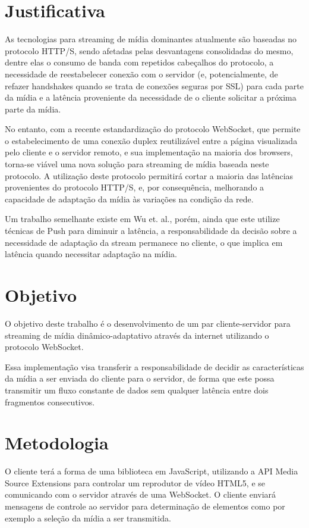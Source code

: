 \documentclass[a4paper,12pt]{article}
\begin{document}
\section{Justificativa}

As tecnologias para streaming de mídia dominantes atualmente são baseadas no protocolo HTTP/S, sendo afetadas pelas desvantagens consolidadas do mesmo, dentre elas o consumo de banda com repetidos cabeçalhos do protocolo, a necessidade de reestabelecer conexão com o servidor (e, potencialmente, de refazer handshakes quando se trata de conexões seguras por SSL) para cada parte 
da mídia e a latência proveniente da necessidade de o cliente solicitar a próxima parte da mídia.

No entanto, com a recente estandardização do protocolo WebSocket, que permite o estabelecimento de uma conexão duplex reutilizável entre a página visualizada pelo cliente e o servidor remoto, e sua implementação na maioria dos browsers, torna-se viável uma nova solução para streaming de mídia baseada neste protocolo. A utilização deste protocolo permitirá cortar a maioria das latências provenientes do protocolo HTTP/S, e, por consequência, melhorando a capacidade de adaptação da mídia às variações na condição da rede.

Um trabalho semelhante existe em Wu et. al.\cite{Wu:2018}, porém, ainda que este utilize técnicas de Push para diminuir a latência, a responsabilidade da decisão sobre a necessidade de adaptação da stream permanece no cliente, o que implica em latência quando necessitar adaptação na mídia.


\section{Objetivo}

O objetivo deste trabalho é o desenvolvimento de um par cliente-servidor para streaming de mídia dinâmico-adaptativo através da internet utilizando o protocolo WebSocket. 

Essa implementação visa transferir a responsabilidade de decidir as características da mídia a ser enviada do cliente para o servidor, de forma que este possa transmitir um fluxo constante de dados sem qualquer latência entre dois fragmentos consecutivos.

\section{Metodologia}

O cliente terá a forma de uma biblioteca em JavaScript, utilizando a API Media Source Extensions para controlar um reprodutor de vídeo HTML5, e se comunicando com o servidor através de uma WebSocket. O cliente enviará mensagens de controle ao servidor para determinação de elementos como por exemplo a seleção da mídia a ser transmitida.
\end{document}
